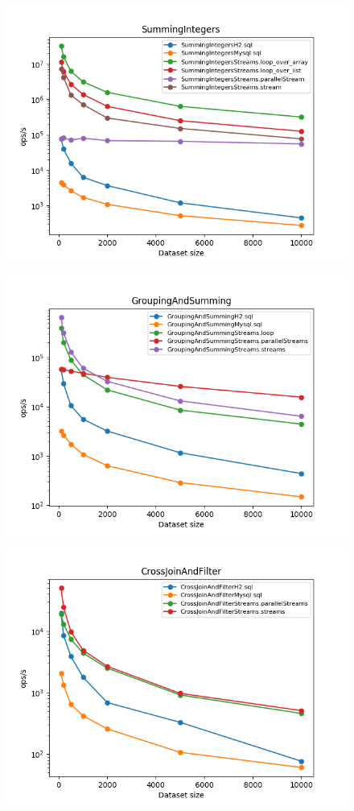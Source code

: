 \documentclass[12pt]{extarticle}
\begin{document}
\begin{figure}[H]
\centering
\includegraphics[width=13cm]{plots/SummingIntegers}
\end{figure}

\begin{figure}[H]
\centering
\includegraphics[width=13cm]{plots/GroupingAndSumming}
\end{figure}

\begin{figure}[H]
\centering
\includegraphics[width=13cm]{plots/CrossJoinAndFilter}
\end{figure}
\end{document}

